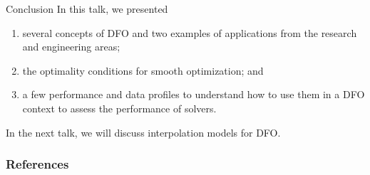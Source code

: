 \documentclass{polyu-presentation}
\begin{document}
\begin{frame}{Conclusion}
    In this talk, we presented
    \begin{enumerate}
        \item several \alert{concepts of DFO} and two examples of \alert{applications} from the research and engineering areas;
        \item the \alert{optimality conditions} for smooth optimization; and
        \item a few \alert{performance and data profiles} to understand how to use them in a DFO context to \alert{assess the performance} of solvers.
    \end{enumerate}

    \bigskip

    In the next talk, we will discuss \alert{interpolation models for DFO}.
\end{frame}

\appendix

\begin{frame}[t,allowframebreaks]
    \frametitle{References}

	\printbibliography
\end{frame}
\end{document}
